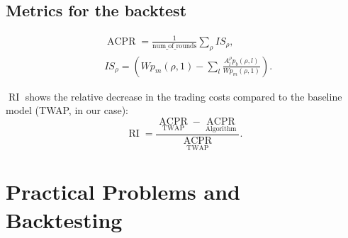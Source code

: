     \subsection{Metrics for the backtest}
        \begin{definition}
            \begin{align}
                & \operatorname*{ACPR} = \frac{1}{\operatorname{num\_of\_rounds}} \sum_\rho IS_\rho,\\
                & IS_\rho = \left( W  p_m(\rho, 1) - \sum_l \frac{A^\rho_l p_b(\rho, l)}{W p_m(\rho, 1)}\right).\nonumber
            \end{align}
        \end{definition}
        \begin{definition}
            $\operatorname*{RI}$ shows the relative decrease in the trading costs compared to the baseline model (TWAP, in our case):
            \begin{equation}
                \operatorname*{RI} = \frac{\operatorname*{ACPR}_{\text{TWAP}} - \operatorname*{ACPR}_{\text{Algorithm}}}{\operatorname*{ACPR}_{\text{TWAP}}}.
            \end{equation}
        \end{definition}

\section{Practical Problems and Backtesting}\label{section:Backtest}
